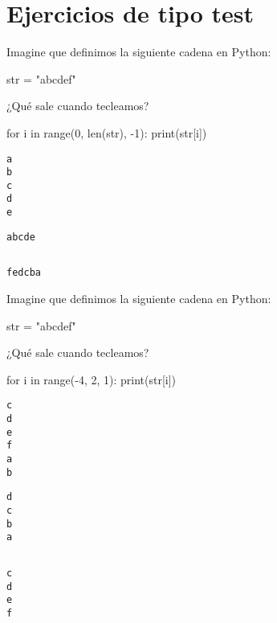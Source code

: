 
\section*{Ejercicios de tipo test}



\begin{ejercicio}Imagine que definimos la siguiente cadena en Python:

\begin{python}
str = "abcdef"
\end{python}

¿Qué sale cuando tecleamos?
\begin{python}
for i in range(0, len(str), -1):
        print(str[i])
\end{python}

\begin{choices}
\choice 
\begin{verbatim}
a
b
c
d
e
\end{verbatim}
\choice
\begin{verbatim}
abcde
\end{verbatim}
\choice %
\begin{verbatim}

\end{verbatim}
\choice
\begin{verbatim}
fedcba
\end{verbatim}
\end{choices}



\end{ejercicio} 

\begin{ejercicio}Imagine que definimos la siguiente cadena en Python:

\begin{python}
str = "abcdef"
\end{python}

¿Qué sale cuando tecleamos?


\begin{python}
for i in range(-4, 2, 1):
        print(str[i])
\end{python}

\begin{choices}
    \choice %
\begin{verbatim}
c
d
e
f
a
b
\end{verbatim}
    \choice
\begin{verbatim}
d
c
b
a
\end{verbatim}
    \choice 
\begin{verbatim}

\end{verbatim}
    \choice
\begin{verbatim}
c
d
e
f
\end{verbatim}
\end{choices}



\end{ejercicio}  

